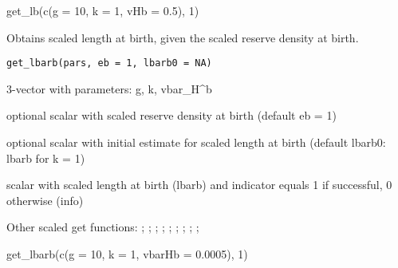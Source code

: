 \documentclass[a4paper]{book}
\begin{document}
%
\begin{Examples}
\begin{ExampleCode}
get_lb(c(g = 10, k = 1, vHb = 0.5), 1)
\end{ExampleCode}
\end{Examples}
%
\begin{Description}\relax
Obtains scaled length at birth, given the scaled reserve density at birth.
\end{Description}
%
\begin{Usage}
\begin{verbatim}
get_lbarb(pars, eb = 1, lbarb0 = NA)
\end{verbatim}
\end{Usage}
%
\begin{Arguments}
\begin{ldescription}
\item[\code{pars}] 3-vector with parameters: g, k, vbar\_H\textasciicircum{}b

\item[\code{eb}] optional scalar with scaled reserve density at birth (default eb = 1)

\item[\code{lbarb0}] optional scalar with initial estimate for scaled length at birth (default lbarb0: lbarb for k = 1)
\end{ldescription}
\end{Arguments}
%
\begin{Value}
scalar with scaled length at birth (lbarb) and indicator equals 1 if successful, 0 otherwise (info)
\end{Value}
%
\begin{SeeAlso}\relax
Other scaled get functions: ;
; ;
; ;
; ;
;
;
\end{SeeAlso}
%
\begin{Examples}
\begin{ExampleCode}
get_lbarb(c(g = 10, k = 1, vbarHb = 0.0005), 1)
\end{ExampleCode}
\end{Examples}
\end{document}
